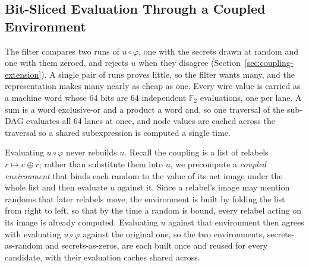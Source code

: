   \subsection{Bit-Sliced Evaluation Through a Coupled Environment}
  \label{sec:bitslice-impl}

  The filter compares two runs of $u \circ \varphi$, one with the secrets drawn at
  random and one with them zeroed, and rejects $u$ when they disagree
  (Section~\ref{sec:coupling-extension}). A single pair of runs proves little, so
  the filter wants many, and the representation makes many nearly as cheap as one.
  Every wire value is carried as a machine word whose $64$ bits are $64$
  independent $\mathbb{F}_2$ evaluations, one per lane. A sum is a word
  exclusive-or and a product a word and, so one traversal of the sub-DAG evaluates
  all $64$ lanes at once, and node values are cached across the traversal so a
  shared subexpression is computed a single time.

  Evaluating $u \circ \varphi$ never rebuilds $u$. Recall the coupling is a list
  of relabels $r \mapsto e \oplus r$; rather than substitute them into $u$, we
  precompute a \emph{coupled environment} that binds each random to the value of
  its net image under the whole list and then evaluate $u$ against it. Since a
  relabel's image may mention randoms that later relabels move, the environment is
  built by folding the list from right to left, so that by the time a random is
  bound, every relabel acting on its image is already computed. Evaluating $u$ against
  that environment then agrees with evaluating $u \circ \varphi$ against the
  original one, so the two environments, secrets-as-random and secrets-as-zeros,
  are each built once and reused for every candidate, with their evaluation caches
  shared across.


